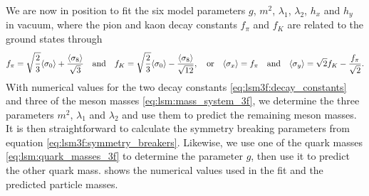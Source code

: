 We are now in position to fit the six model parameters $g$, $m^2$, $\lambda_1$, $\lambda_2$, $h_x$ and $h_y$ in vacuum,
where the pion and kaon decay constants $f_\pi$ and $f_K$ are related to the ground states through
\cite{ref:lsm3f_details}
\begin{equation}
	f_\pi = \sqrt{\frac23} \langle \sigma_0 \rangle + \frac{\langle \sigma_8 \rangle}{\sqrt{3}}
	\quad \text{and} \quad
	f_K = \sqrt{\frac23} \langle \sigma_0 \rangle - \frac{\langle \sigma_8 \rangle}{\sqrt{12}},
	\quad \text{or} \quad
	\langle \sigma_x \rangle = f_\pi
	\quad \text{and} \quad
	\langle \sigma_y \rangle = \sqrt{2} f_K - \frac{f_\pi}{\sqrt{2}}.
\label{eq:lsm3f:decay_constants}
\end{equation}
With numerical values for the two decay constants \eqref{eq:lsm3f:decay_constants} and three of the meson masses \eqref{eq:lsm:mass_system_3f},
we determine the three parameters $m^2$, $\lambda_1$ and $\lambda_2$ and use them to predict the remaining meson masses.
It is then straightforward to calculate the symmetry breaking parameters from equation \eqref{eq:lsm3f:symmetry_breakers}.
Likewise, we use one of the quark masses \eqref{eq:lsm:quark_masses_3f} to determine the parameter $g$, then use it to predict the other quark mass.
 shows the numerical values used in the fit and the predicted particle masses.


